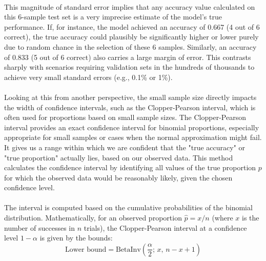 \documentclass[12pt,a4paper]{report}
\begin{document}
\\
This magnitude of standard error implies that any accuracy value calculated on this 6-sample test set is a very imprecise estimate of the model's true performance. If, for instance, the model achieved an accuracy of 0.667 (4 out of 6 correct), the true accuracy could plausibly be significantly higher or lower purely due to random chance in the selection of these 6 samples. Similarly, an accuracy of 0.833 (5 out of 6 correct) also carries a large margin of error. This contrasts sharply with scenarios requiring validation sets in the hundreds of thousands to achieve very small standard errors (e.g., 0.1\% or 1\%).\\
\\
Looking at this from another perspective, the small sample size directly impacts the width of confidence intervals, such as the Clopper-Pearson interval, which is often used for proportions based on small sample sizes. The Clopper-Pearson interval provides an exact confidence interval for binomial proportions, especially appropriate for small samples or cases when the normal approximation might fail. It gives us a range within which we are confident that the "true accuracy" or "true proportion" actually lies, based on our observed data. This method calculates the confidence interval by identifying all values of the true proportion $p$ for which the observed data would be reasonably likely, given the chosen confidence level.\\
\\
The interval is computed based on the cumulative probabilities of the binomial distribution. Mathematically, for an observed proportion $\hat{p} = x/n$ (where $x$ is the number of successes in
$n$ trials), the Clopper-Pearson interval at a confidence level $1-\alpha$ is given by the bounds:
\[
\text{Lower bound} = \text{BetaInv}\left(\frac{\alpha}{2};\, x,\, n - x + 1\right)
\]
\end{document}
